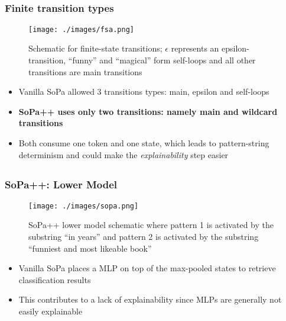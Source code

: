 \documentclass[10pt]{beamer}
\let\oldcitep=\citep
\renewcommand\citep[1]{{\textcolor{blue}{\oldcitep{#1}}}}
\begin{document}
\subsection{}
\begin{frame}
  \frametitle{Finite transition types}
  \begin{figure}				       
    \captionsetup{justification=centering}
    \texttt{[image: ./images/fsa.png]}
    \caption{Schematic for finite-state transitions; $\epsilon$ represents an epsilon-transition, ``funny'' and ``magical'' form self-loops and all other transitions are main transitions \citep{schwartz2018sopa}}
  \end{figure}
  \begin{itemize} 
    \item Vanilla SoPa allowed 3 transitions types: main, epsilon and self-loops
    \item \textbf{SoPa++ uses only two transitions: namely main and wildcard transitions}
    \item Both consume one token and one state, which leads to pattern-string determinism and could make the \textit{explainability} step easier
  \end{itemize} 
\end{frame} 

\subsection{}
\begin{frame}
  \frametitle{SoPa++: Lower Model}
  \begin{figure}				       
    \captionsetup{justification=centering}
    \texttt{[image: ./images/sopa.png]}
    \caption{SoPa++ lower model schematic where pattern 1 is activated by the substring ``in years'' and pattern 2 is activated by the substring ``funniest and most likeable book'' \citep{schwartz2018sopa}}
  \end{figure}
  \begin{itemize}
    \setlength\itemsep{0.6em}
    \item Vanilla SoPa places a MLP on top of the max-pooled states to retrieve classification results
    \item This contributes to a lack of explainability since MLPs are generally not easily explainable
  \end{itemize} 
\end{frame}
\end{document}
